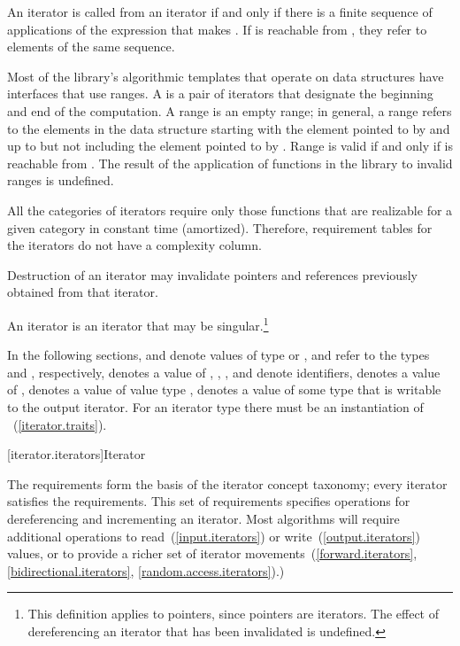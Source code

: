 \pnum
An iterator
is called
from an iterator
if and only if there is a finite sequence of applications of
the expression
that makes
.
If
is reachable from
,
they refer to elements of the same sequence.

\pnum
Most of the library's algorithmic templates that operate on data structures have interfaces that use ranges.
A
is a pair of iterators that designate the beginning and end of the computation.
A range 
is an empty range;
in general, a range 
refers to the elements in the data structure starting with the element
pointed to by
and up to but not including the element pointed to by
.
Range 
is valid if and only if
is reachable from
.
The result of the application of functions in the library to invalid ranges is
undefined.

\pnum
All the categories of iterators require only those functions that are realizable for a given category in
constant time (amortized).
Therefore, requirement tables for the iterators do not have a complexity column.

\pnum
Destruction of an iterator may invalidate pointers and references
previously obtained from that iterator.

\pnum
An
iterator is an iterator that may be singular.\footnote{This definition applies to pointers, since pointers are iterators.
The effect of dereferencing an iterator that has been invalidated
is undefined.
}

\pnum
In the following sections,
and
denote values of type
 or ,
 and  refer to the
types  and
, respectively,
denotes a value of
,
,
,
and
denote identifiers,
denotes a value of
,
denotes a value of value type
,
denotes a value of some type that is writable to the output iterator.
\enternote For an iterator type  there must be an instantiation
of ~(\ref{iterator.traits}). \exitnote

[iterator.iterators]{Iterator}

\pnum
The  requirements form the basis of the iterator concept
taxonomy; every iterator satisfies the  requirements. This
set of requirements specifies operations for dereferencing and incrementing
an iterator. Most algorithms will require additional operations to
read~(\ref{input.iterators}) or write~(\ref{output.iterators}) values, or
to provide a richer set of iterator movements~(\ref{forward.iterators},
\ref{bidirectional.iterators}, \ref{random.access.iterators}).)

